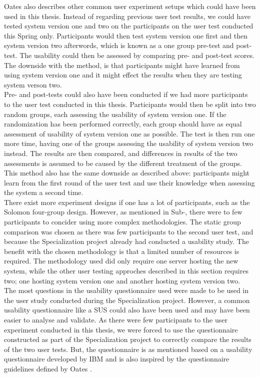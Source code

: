 Oates also describes other common user experiment setups which could have been used in this thesis. Instead of regarding previous user test results, we could have tested system version one and two on the participants on the user test conducted this Spring only. Participants would then test system version one first and then system version two afterwords, which is known as a one group pre-test and post-test. The usability could then be assessed by comparing pre- and post-test scores. The downside with the method, is that participants might have learned from using system version one and it might effect the results when they are testing system verson two. \\

Pre- and post-tests could also have been conducted if we had more participants to the user test conducted in this thesis. Participants would then be split into two random groups, each assessing the usability of system version one. If the randomization has been performed correctly, each group should have as equal assessment of usability of system version one as possible. The test is then run one more time, having one of the groups assessing the usability of system version two instead. The results are then compared, and differences in results of the two assessments is assumed to be caused by the different treatment of the groups. This method also has the same downside as described above: participants might learn from the first round of the user test and use their knowledge when assessing the system a second time. \\

There exist more experiment designs if one has a lot of participants, such as the Solomon four-group design. However, as mentioned in Sub-, there were to few participants to concider using more complex methodologies. The static group comparison was chosen as there was few participants to the second user test, and because the Specialization project already had conducted a usability study. The benefit with the chosen methodology is that a limited number of resources is required. The methodology used did only require one server hosting the new system, while the other user testing approches described in this section requires two; one hosting system version one and another hosting system version two. \\

The most questions in the usability questionnaire used were made to be used in the user study conducted during the Specialization project. However, a common usability questionnaire like a SUS \cite{brooke1996} could also have been used and may have been easier to analyse and validate. As there were few participants to the user experiment conducted in this thesis, we were forced to use the questionnaire constructed as part of the Specialization project to correctly compare the results of the two user tests. But, the questionnaire is as mentioned based on a usability questionnaire developed by IBM and is also inspired by the questionnaire guidelines defined by Oates \cite{Oates2006}. \\

